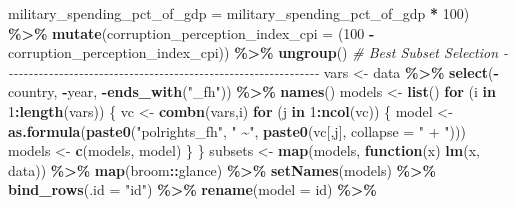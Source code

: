 \documentclass[
  english,
  man,floatsintext]{apa6}
\newenvironment{Shaded}{\begin{snugshade}}{\end{snugshade}}
\newcommand{\CommentTok}[1]{\textcolor[rgb]{0.56,0.35,0.01}{\textit{#1}}}
\newcommand{\ControlFlowTok}[1]{\textcolor[rgb]{0.13,0.29,0.53}{\textbf{#1}}}
\newcommand{\DataTypeTok}[1]{\textcolor[rgb]{0.13,0.29,0.53}{#1}}
\newcommand{\DecValTok}[1]{\textcolor[rgb]{0.00,0.00,0.81}{#1}}
\newcommand{\KeywordTok}[1]{\textcolor[rgb]{0.13,0.29,0.53}{\textbf{#1}}}
\newcommand{\NormalTok}[1]{#1}
\newcommand{\OperatorTok}[1]{\textcolor[rgb]{0.81,0.36,0.00}{\textbf{#1}}}
\newcommand{\StringTok}[1]{\textcolor[rgb]{0.31,0.60,0.02}{#1}}
\begin{document}
\begin{Shaded}
\begin{Highlighting}[]
 \DataTypeTok{military\_spending\_pct\_of\_gdp =}\NormalTok{ military\_spending\_pct\_of\_gdp }\OperatorTok{*}\StringTok{ }\DecValTok{100}\NormalTok{) }\OperatorTok{\%\textgreater{}\%}\StringTok{ }
\StringTok{  }\KeywordTok{mutate}\NormalTok{(}\DataTypeTok{corruption\_perception\_index\_cpi =}\NormalTok{ (}\DecValTok{100} \OperatorTok{{-}}\StringTok{ }\NormalTok{corruption\_perception\_index\_cpi)) }\OperatorTok{\%\textgreater{}\%}\StringTok{ }
\StringTok{  }\KeywordTok{ungroup}\NormalTok{()}
\CommentTok{\# Best Subset Selection {-}{-}{-}{-}{-}{-}{-}{-}{-}{-}{-}{-}{-}{-}{-}{-}{-}{-}{-}{-}{-}{-}{-}{-}{-}{-}{-}{-}{-}{-}{-}{-}{-}{-}{-}{-}{-}{-}{-}{-}{-}{-}{-}{-}{-}{-}{-}{-}{-}{-}{-}{-}{-}{-}{-}{-}{-}{-}{-}{-}{-}{-}{-}}
\NormalTok{vars \textless{}{-}}\StringTok{ }\NormalTok{data }\OperatorTok{\%\textgreater{}\%}\StringTok{ }
\StringTok{  }\KeywordTok{select}\NormalTok{(}\OperatorTok{{-}}\NormalTok{country, }\OperatorTok{{-}}\NormalTok{year, }\OperatorTok{{-}}\KeywordTok{ends\_with}\NormalTok{(}\StringTok{"\_fh"}\NormalTok{)) }\OperatorTok{\%\textgreater{}\%}
\StringTok{  }\KeywordTok{names}\NormalTok{()}
\NormalTok{models \textless{}{-}}\StringTok{ }\KeywordTok{list}\NormalTok{()}
\ControlFlowTok{for}\NormalTok{ (i }\ControlFlowTok{in} \DecValTok{1}\OperatorTok{:}\KeywordTok{length}\NormalTok{(vars)) \{}
\NormalTok{  vc \textless{}{-}}\StringTok{ }\KeywordTok{combn}\NormalTok{(vars,i)}
  \ControlFlowTok{for}\NormalTok{ (j }\ControlFlowTok{in} \DecValTok{1}\OperatorTok{:}\KeywordTok{ncol}\NormalTok{(vc)) \{}
\NormalTok{    model \textless{}{-}}\StringTok{ }\KeywordTok{as.formula}\NormalTok{(}\KeywordTok{paste0}\NormalTok{(}\StringTok{"polrights\_fh"}\NormalTok{, }\StringTok{" \textasciitilde{}"}\NormalTok{, }\KeywordTok{paste0}\NormalTok{(vc[,j], }\DataTypeTok{collapse =} \StringTok{" + "}\NormalTok{)))}
\NormalTok{    models \textless{}{-}}\StringTok{ }\KeywordTok{c}\NormalTok{(models, model)}
\NormalTok{    \}}
\NormalTok{  \}}
\NormalTok{subsets \textless{}{-}}\StringTok{ }\KeywordTok{map}\NormalTok{(models, }\ControlFlowTok{function}\NormalTok{(x) }\KeywordTok{lm}\NormalTok{(x, data)) }\OperatorTok{\%\textgreater{}\%}\StringTok{ }
\StringTok{  }\KeywordTok{map}\NormalTok{(broom}\OperatorTok{::}\NormalTok{glance) }\OperatorTok{\%\textgreater{}\%}\StringTok{ }
\StringTok{  }\KeywordTok{setNames}\NormalTok{(models) }\OperatorTok{\%\textgreater{}\%}\StringTok{ }
\StringTok{  }\KeywordTok{bind\_rows}\NormalTok{(}\DataTypeTok{.id =} \StringTok{"id"}\NormalTok{) }\OperatorTok{\%\textgreater{}\%}\StringTok{ }
\StringTok{  }\KeywordTok{rename}\NormalTok{(}\DataTypeTok{model =}\NormalTok{ id) }\OperatorTok{\%\textgreater{}\%}\StringTok{ }

\end{Highlighting}
\end{Shaded}
\end{document}

